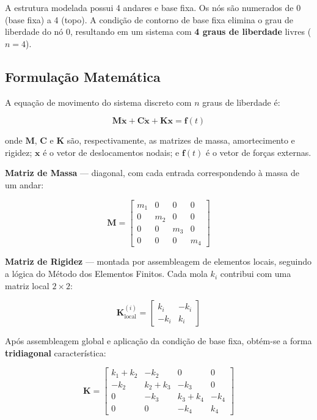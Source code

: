 \documentclass[12pt, a4paper, oneside]{article}
\numberwithin{equation}{section}
\numberwithin{figure}{section}
\numberwithin{table}{section}
\newcommand{\mat}[1]{\mathbf{#1}}
\begin{document}
A estrutura modelada possui 4 andares e base fixa. Os nós são numerados de 0
(base fixa) a 4 (topo). A condição de contorno de base fixa elimina o grau de
liberdade do nó 0, resultando em um sistema com \textbf{4 graus de liberdade}
livres ($n = 4$).

\subsection{Formulação Matemática}

A equação de movimento do sistema discreto com $n$ graus de liberdade é:

\begin{equation}\label{eq:eom}
  \mat{M}\ddot{\mat{x}} + \mat{C}\dot{\mat{x}} + \mat{K}\mat{x} = \mat{f}(t)
\end{equation}

\noindent
onde $\mat{M}$, $\mat{C}$ e $\mat{K}$ são, respectivamente, as matrizes de
massa, amortecimento e rigidez; $\mat{x}$ é o vetor de deslocamentos nodais;
e $\mat{f}(t)$ é o vetor de forças externas.

\medskip
\noindent\textbf{Matriz de Massa} --- diagonal, com cada entrada
correspondendo à massa de um andar:

\begin{equation}\label{eq:M}
  \mat{M} = \begin{bmatrix}
    m_1 & 0   & 0   & 0   \\
    0   & m_2 & 0   & 0   \\
    0   & 0   & m_3 & 0   \\
    0   & 0   & 0   & m_4
  \end{bmatrix}
\end{equation}

\medskip
\noindent\textbf{Matriz de Rigidez} --- montada por assembleagem de elementos
locais, seguindo a lógica do Método dos Elementos Finitos. Cada mola $k_i$
contribui com uma matriz local $2\times 2$:

\begin{equation}\label{eq:K_local}
  \mat{K}^{(i)}_{\text{local}} =
  \begin{bmatrix} k_i & -k_i \\ -k_i & k_i \end{bmatrix}
\end{equation}

Após assembleagem global e aplicação da condição de base fixa, obtém-se a
forma \textbf{tridiagonal} característica:

\begin{equation}\label{eq:K_global}
  \mat{K} = \begin{bmatrix}
    k_1+k_2 & -k_2    & 0       & 0    \\
    -k_2    & k_2+k_3 & -k_3    & 0    \\
    0       & -k_3    & k_3+k_4 & -k_4 \\
    0       & 0       & -k_4    & k_4
  \end{bmatrix}
\end{equation}
\end{document}
